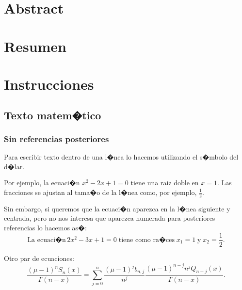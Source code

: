 \documentclass[a4paper,12pt,%
]{memoir}
\begin{document}
\pagestyle{empty}
\thispagestyle{empty}
\begin{center}
\end{center}

\cleardoublepage
\frontmatter
\tableofcontents*
\cleardoublepage

\chapter*{Abstract}
\vspace*{1cm}
\lipsum%

\chapter*{Resumen}
\vspace*{1cm}
\lipsum%

\mainmatter
\chapter{Instrucciones}
\pagestyle{ruled}%

\section{Texto matem�tico}
\subsection{Sin referencias posteriores}
Para escribir texto dentro de una l�nea lo hacemos utilizando el
s�mbolo del d�lar.
\par
Por ejemplo, la ecuaci�n $x^2-2x+1=0$ tiene una raiz doble en $x=1$.
Las fracciones se ajustan al tama�o de la l�nea como, por ejemplo,
$\frac{1}{2}$.
\par
Sin embargo, si queremos que la ecuaci�n aparezca en la l�nea
siguiente y centrada, pero no nos interesa que aparezca numerada para
posteriores referencias lo hacemos as�:
\[
  \text{La ecuaci�n}\, 2x^2-3x+1=0\;\text{tiene como ra�ces}\; x_1=1\;
  \text{y} \; x_2=\frac{1}{2}.
\]
\par
Otro par de ecuaciones:
\[
\frac{(\mu-1)^{n} S_{n}(x)}{\Gamma(n-x)}=\sum_{j=0}^n \frac{(\mu-1)^j
  b_{n,j}}{n^j} \frac{(\mu-1)^{n-j} n^j Q_{n-j}(x)}{\Gamma(n-x)}.
\]
\end{document}
